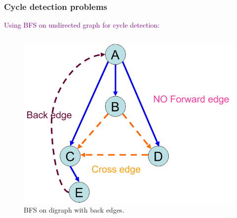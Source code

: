 \begin{frame}
  \frametitle{Cycle detection problems}

  \begin{center}
    \textcolor{purple}{Using BFS on undirected graph for cycle detection:}
  \end{center}

  \begin{columns}
    \begin{column}{0.50\textwidth}
      \begin{figure}
        \includegraphics[scale=0.30]{figure/bfs_dfs/bfsdi}
        \caption{{\scriptsize BFS on digraph with back edges.}}
        \label{fig:bfsundirected}
      \end{figure}
    \end{column}


\end{columns}
\end{frame}
